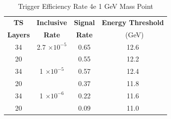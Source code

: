 \begin{table}
 \centering
\caption{Trigger Efficiency Rate 4e 1 GeV Mass Point}
\begin{tabular}{ c | c | c | c }
\textbf{TS} & \textbf{Inclusive} & \textbf{Signal} & \textbf{Energy Threshold}  \\ \textbf{Layers} & \textbf{Rate} & \textbf{Rate} & \ (GeV) \\ 
\hline
34 & 2.7 $\times 10^{-5}$ & 0.65 & 12.6 \\ 
20 & & 0.55 & 12.2 \\ 
\hline 
34 & 1 $\times 10^{-5}$ & 0.57 & 12.4 \\ 
20 & & 0.37 & 11.8 \\ 
\hline 
34 & 1 $\times 10^{-6}$ & 0.22 & 11.6 \\ 
20 & & 0.09 & 11.0 \\ 
\hline 
\end{tabular}
\end{table}

